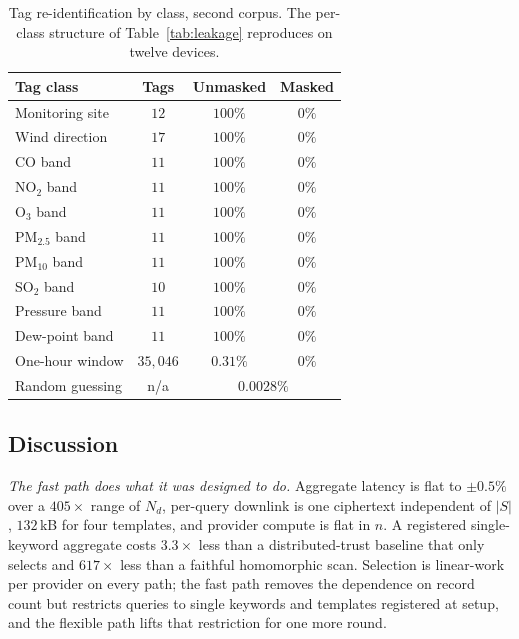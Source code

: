 \documentclass[a4paper,fleqn]{cas-sc}
\begin{document}
\begin{table}[pos=htbp]
\caption{Tag re-identification by class, second corpus. The per-class
structure of Table~\ref{tab:leakage} reproduces on twelve devices.}
\label{tab:leakagebeijing}
\centering
\footnotesize
\setlength{\tabcolsep}{3pt}
\renewcommand{\arraystretch}{1.15}
\begin{tabular*}{\tblwidth}{@{\extracolsep{\fill}}lccc@{}}
\toprule
Tag class & Tags & Unmasked & Masked \\
\midrule
Monitoring site        & $12$       & $100\%$   & $0\%$ \\
Wind direction         & $17$       & $100\%$   & $0\%$ \\
CO band                & $11$       & $100\%$   & $0\%$ \\
NO$_2$ band            & $11$       & $100\%$   & $0\%$ \\
O$_3$ band             & $11$       & $100\%$   & $0\%$ \\
PM$_{2.5}$ band        & $11$       & $100\%$   & $0\%$ \\
PM$_{10}$ band         & $11$       & $100\%$   & $0\%$ \\
SO$_2$ band            & $10$       & $100\%$   & $0\%$ \\
Pressure band          & $11$       & $100\%$   & $0\%$ \\
Dew-point band         & $11$       & $100\%$   & $0\%$ \\
One-hour window        & $35{,}046$ & $0.31\%$  & $0\%$ \\
\midrule
Random guessing        & n/a        & \multicolumn{2}{c}{$0.0028\%$} \\
\bottomrule
\end{tabular*}
\end{table}








\subsection{Discussion}
\emph{The fast path does what it was designed to do.} Aggregate latency is
flat to $\pm0.5\%$ over a $405\times$ range of $N_d$, per-query downlink is one
ciphertext independent of $|S|$, $132$\,kB for four templates, and provider
compute is flat in $n$. A registered single-keyword aggregate costs
$3.3\times$ less than a distributed-trust baseline that only selects and
$617\times$ less than a faithful homomorphic scan. Selection is linear-work
per provider on every path; the fast path removes the dependence on record
count but restricts queries to single keywords and templates registered at
setup, and the flexible path lifts that restriction for one more round.
\end{document}
